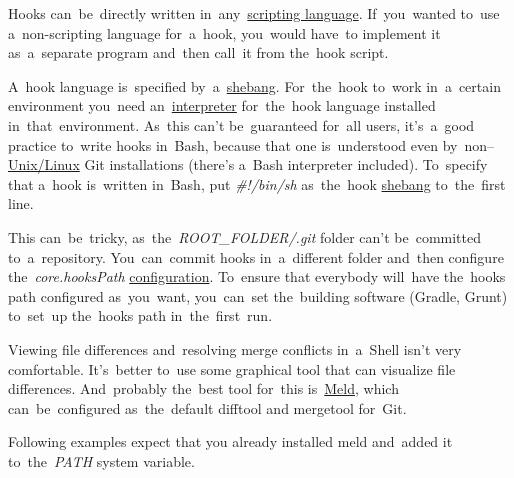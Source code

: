 Hooks can~be~directly written in~any~\hyperref[scriptinglanguages]{scripting language}. If~you~wanted to~use a~non-scripting language for~a~hook, you~would have~to implement it as~a~separate program and~then call~it from the~hook script.

A~hook language is~specified by~a~\hyperref[scriptinglanguages]{shebang}. For~the~hook to~work in~a~certain environment you~need an~\hyperref[compiledinterpretedlanguages]{interpreter} for~the~hook language installed in~that~environment. As~this can't be~guaranteed for~all users, it's~a~good practice to~write hooks in~Bash, because that one is~understood even  by~non--\hyperref[unixlinux]{Unix/Linux} Git installations (there's a~Bash interpreter included). To~specify that a~hook is~written in~Bash, put \textit{\#!/bin/sh} as~the~hook \hyperref[scriptinglanguages]{shebang} to~the~first line.

This can~be~tricky, as~the~\textit{ROOT\_FOLDER/.git} folder can't be~committed to~a~repository. You~can~commit hooks in~a~different folder and~then configure the~\textit{core.hooksPath} \hyperref[gitconfig]{configuration}. To~ensure that everybody will~have the~hooks path configured as~you~want, you~can~set the~building software (Gradle, Grunt) to~set~up the~hooks path in~the~first~run.

Viewing file differences and~resolving merge conflicts in~a~Shell isn't very comfortable. It's~better to~use some graphical tool that can visualize file differences. And~probably the~best tool for~this is~\href{https://meldmerge.org/}{Meld}, which can~be~configured as~the~default difftool and mergetool for~Git.

Following examples expect that you already installed meld and~added it to~the~\textit{PATH} system variable.

